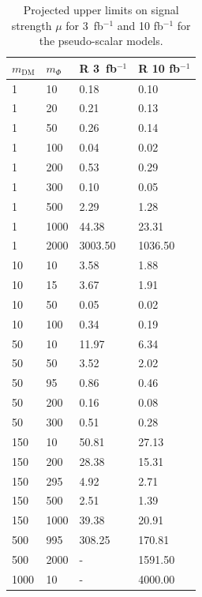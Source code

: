 \begin{table}[h!]
\begin{minipage}{.45\textwidth}
{  \begin{tabular}{llll}
    \hline                      
    $m_\textrm{DM}$ & $m_\Phi$  & R 3~fb$^{-1}$ & R 10 fb$^{-1}$ \\ \hline
    1       & 10      & 0.18    & 0.10 \\ \hline
    1       & 20      & 0.21    & 0.13 \\ \hline
    1       & 50      & 0.26    & 0.14 \\ \hline
    1       & 100     & 0.04    & 0.02 \\ \hline
    1       & 200     & 0.53    & 0.29 \\ \hline
    1       & 300     & 0.10    & 0.05 \\ \hline
    1       & 500     & 2.29    & 1.28 \\ \hline
    1       & 1000    & 44.38   & 23.31 \\ \hline
    1       & 2000    & 3003.50 & 1036.50 \\ \hline
    10      & 10      & 3.58    & 1.88 \\ \hline
    10      & 15      & 3.67    & 1.91 \\ \hline
    10      & 50      & 0.05    & 0.02 \\ \hline
    10      & 100     & 0.34    & 0.19 \\ \hline
    50      & 10      & 11.97   & 6.34 \\ \hline
    50      & 50      & 3.52    & 2.02 \\ \hline
    50      & 95      & 0.86    & 0.46 \\ \hline
    50      & 200     & 0.16    & 0.08 \\ \hline
    50      & 300     & 0.51    & 0.28 \\ \hline
    150     & 10      & 50.81   & 27.13 \\ \hline
    150     & 200     & 28.38   & 15.31 \\ \hline
    150     & 295     & 4.92    & 2.71 \\ \hline
    150     & 500     & 2.51    & 1.39 \\ \hline
    150     & 1000    & 39.38   & 20.91 \\ \hline
    500     & 995     & 308.25  & 170.81 \\ \hline
    500     & 2000    & -       & 1591.50 \\ \hline
    1000    & 10      & -       & 4000.00 \\ \hline
  \end{tabular}
  \caption{Projected  upper limits on signal strength $\mu$ for 3~fb$^{-1}$ and 10 fb$^{-1}$ for the pseudo-scalar models. \label{tab:dm_P_R_values}}
}\end{minipage}
\end{table}



